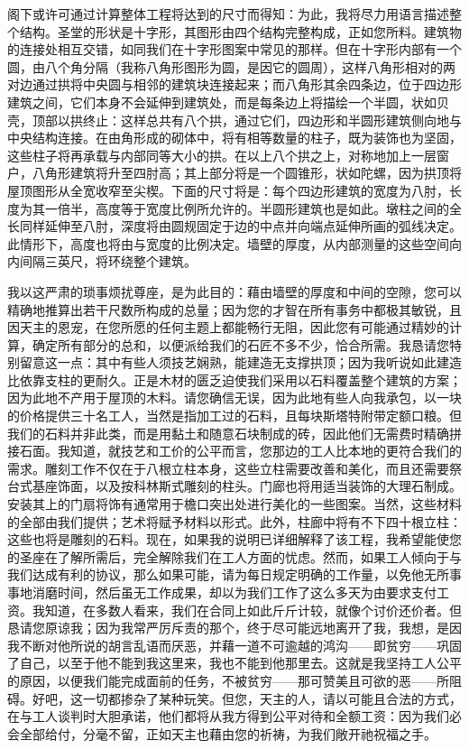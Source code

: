阁下或许可通过计算整体工程将达到的尺寸而得知：为此，我将尽力用语言描述整个结构。圣堂的形状是十字形，其图形由四个结构完整构成，正如您所料。建筑物的连接处相互交错，如同我们在十字形图案中常见的那样。但在十字形内部有一个圆，由八个角分隔（我称八角形图形为圆，是因它的圆周），这样八角形相对的两对边通过拱将中央圆与相邻的建筑块连接起来；而八角形其余四条边，位于四边形建筑之间，它们本身不会延伸到建筑处，而是每条边上将描绘一个半圆，状如贝壳，顶部以拱终止：这样总共有八个拱，通过它们，四边形和半圆形建筑侧向地与中央结构连接。在由角形成的砌体中，将有相等数量的柱子，既为装饰也为坚固，这些柱子将再承载与内部同等大小的拱。在以上八个拱之上，对称地加上一层窗户，八角形建筑将升至四肘高；其上部分将是一个圆锥形，状如陀螺，因为拱顶将屋顶图形从全宽收窄至尖楔。下面的尺寸将是：每个四边形建筑的宽度为八肘，长度为其一倍半，高度等于宽度比例所允许的。半圆形建筑也是如此。墩柱之间的全长同样延伸至八肘，深度将由圆规固定于边的中点并向端点延伸所画的弧线决定。此情形下，高度也将由与宽度的比例决定。墙壁的厚度，从内部测量的这些空间向内间隔三英尺，将环绕整个建筑。\par

我以这严肃的琐事烦扰尊座，是为此目的：藉由墙壁的厚度和中间的空隙，您可以精确地推算出若干尺数所构成的总量；因为您的才智在所有事务中都极其敏锐，且因天主的恩宠，在您所愿的任何主题上都能畅行无阻，因此您有可能通过精妙的计算，确定所有部分的总和，以便派给我们的石匠不多不少，恰合所需。我恳请您特别留意这一点：其中有些人须技艺娴熟，能建造无支撑拱顶；因为我听说如此建造比依靠支柱的更耐久。正是木材的匮乏迫使我们采用以石料覆盖整个建筑的方案；因为此地不产用于屋顶的木料。请您确信无误，因为此地有些人向我承包，以一块的价格提供三十名工人，当然是指加工过的石料，且每块斯塔特附带定额口粮。但我们的石料并非此类，而是用黏土和随意石块制成的砖，因此他们无需费时精确拼接石面。我知道，就技艺和工价的公平而言，您那边的工人比本地的更符合我们的需求。雕刻工作不仅在于八根立柱本身，这些立柱需要改善和美化，而且还需要祭台式基座饰面，以及按科林斯式雕刻的柱头。门廊也将用适当装饰的大理石制成。安装其上的门扇将饰有通常用于檐口突出处进行美化的一些图案。当然，这些材料的全部由我们提供；艺术将赋予材料以形式。此外，柱廊中将有不下四十根立柱：这些也将是雕刻的石料。现在，如果我的说明已详细解释了该工程，我希望能使您的圣座在了解所需后，完全解除我们在工人方面的忧虑。然而，如果工人倾向于与我们达成有利的协议，那么如果可能，请为每日规定明确的工作量，以免他无所事事地消磨时间，然后虽无工作成果，却以为我们工作了这么多天为由要求支付工资。我知道，在多数人看来，我们在合同上如此斤斤计较，就像个讨价还价者。但恳请您原谅我；因为我常严厉斥责的那个，终于尽可能远地离开了我，我想，是因我不断对他所说的胡言乱语而厌恶，并藉一道不可逾越的鸿沟——即贫穷——巩固了自己，以至于他不能到我这里来，我也不能到他那里去。这就是我坚持工人公平的原因，以便我们能完成面前的任务，不被贫穷——那可赞美且可欲的恶——所阻碍。好吧，这一切都掺杂了某种玩笑。但您，天主的人，请以可能且合法的方式，在与工人谈判时大胆承诺，他们都将从我方得到公平对待和全额工资：因为我们必会全部给付，分毫不留，正如天主也藉由您的祈祷，为我们敞开祂祝福之手。\par

